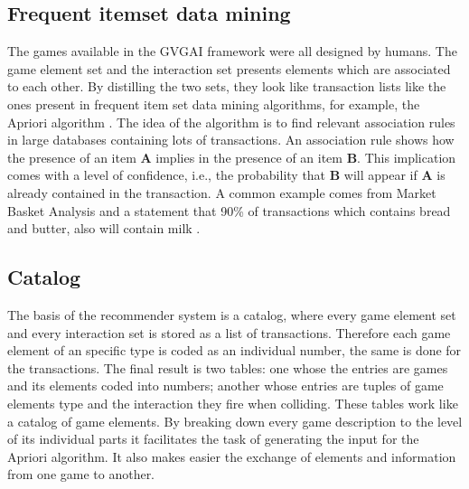 \documentclass[letterpaper]{article} %
\begin{document}
\subsection{Frequent itemset data mining}
The games available in the GVGAI framework were all designed by humans. The game element set and the interaction set presents elements which are associated to each other. By distilling the two sets, they look like transaction lists like the ones present in frequent item set data mining algorithms, for example, the Apriori algorithm \cite{guo2017application}. The idea of the algorithm is to find relevant association rules in large databases containing lots of transactions. An association rule shows how the presence of an item \textbf{A} implies in the presence of an item \textbf{B}. This implication comes with a level of confidence, i.e., the probability that \textbf{B} will appear if \textbf{A} is already contained in the transaction. A common example comes from Market Basket Analysis \cite{brin1997dynamic} and a statement that 90\% of transactions which contains bread and butter, also will contain milk \cite{agrawal1993mining}.

\subsection{Catalog}
The basis of the recommender system is a catalog, where every game element set and every interaction set is stored as a list of transactions. Therefore each game element of an specific type is coded as an individual number, the same is done for the transactions. The final result is two tables: one whose the entries are games and its elements coded into numbers; another whose entries are tuples of game elements type and the interaction they fire when colliding. These tables work like a catalog of game elements. By breaking down every game description to the level of its individual parts it facilitates the task of generating the input for the Apriori algorithm. It also makes easier the exchange of elements and information from one game to another.
\end{document}
